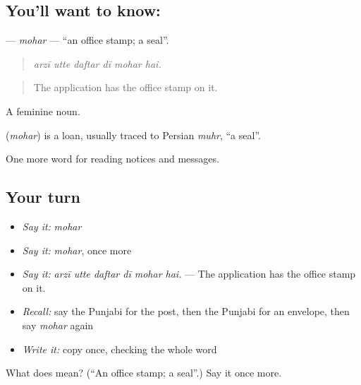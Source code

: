 \subsection*{You'll want to know: }
\textbf{} — \emph{mohar} — \textquotedblleft{}an office stamp; a seal\textquotedblright{}.

\begin{quote}
     
\end{quote}

\begin{quote}
\emph{arzī utte daftar dī mohar hai.}
\end{quote}

\begin{quote}
The application has the office stamp on it.
\end{quote}

A feminine noun.

\begin{cousinweb}
\textbf{} (\emph{mohar}) is a loan, usually traced to Persian \emph{muhr}, \textquotedblleft{}a seal\textquotedblright{}.
\end{cousinweb}

\begin{grammarlens}[title={What you've built}]
One more word for reading notices and messages.
\end{grammarlens}

\subsection*{Your turn}
\begin{itemize}
\raggedright
  \item \emph{Say it:} \emph{mohar}
  \item \emph{Say it:} \emph{mohar}, once more
  \item \emph{Say it:} \emph{arzī utte daftar dī mohar hai.} — The application has the office stamp on it.
  \item \emph{Recall:} say the Punjabi for the post, then the Punjabi for an envelope, then say \emph{mohar} again
  \item \emph{Write it:} copy \textbf{} once, checking the whole word
\end{itemize}

\begin{tcolorbox}[breakable,colback=teal!4,colframe=teal!35!black,title={Before you move on}]
What does  mean? (\textquotedblleft{}An office stamp; a seal\textquotedblright{}.) Say it once more.
\end{tcolorbox}
